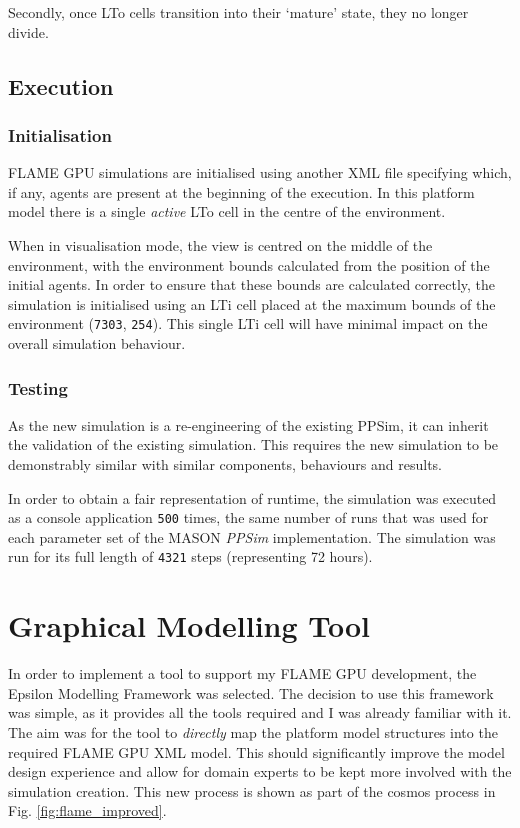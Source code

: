 \documentclass{UoYCSproject}
\begin{document}
Secondly, once \gls{LTo} cells transition into their `mature' state, they no longer divide.

\subsection{Execution}
\subsubsection{Initialisation}
\gls{FLAME GPU} simulations are initialised using another XML file specifying which, if any, agents are present at the beginning of the execution.
In this platform model there is a single \textit{active} \gls{LTo} cell in the centre of the environment.

When in visualisation mode, the view is centred on the middle of the environment, with the environment bounds calculated from the position of the initial agents.
In order to ensure that these bounds are calculated correctly, the simulation is initialised using an \gls{LTi} cell placed at the maximum bounds of the environment (\texttt{7303}, \texttt{254}).
This single \gls{LTi} cell will have minimal impact on the overall simulation behaviour.

\subsubsection{Testing}
As the new simulation is a re-engineering of the existing PPSim, it can inherit the validation of the existing simulation.
This requires the new simulation to be demonstrably similar with similar components, behaviours and results.

In order to obtain a fair representation of runtime, the simulation was executed as a console application \texttt{500} times, the same number of runs that was used for each parameter set of the MASON \textit{PPSim} implementation.
The simulation was run for its full length of \texttt{4321} steps (representing 72 hours).


\section{Graphical Modelling Tool}
In order to implement a tool to support my \gls{FLAME GPU} development, the Epsilon Modelling Framework was selected.
The decision to use this framework was simple, as it provides all the tools required and I was already familiar with it.
The aim was for the tool to \textit{directly} map the platform model structures into the required \gls{FLAME GPU} XML model.
This should significantly improve the model design experience and allow for domain experts to be kept more involved with the simulation creation.
This new process is shown as part of the \gls{cosmos} process in Fig. \ref{fig:flame_improved}.
\end{document}
